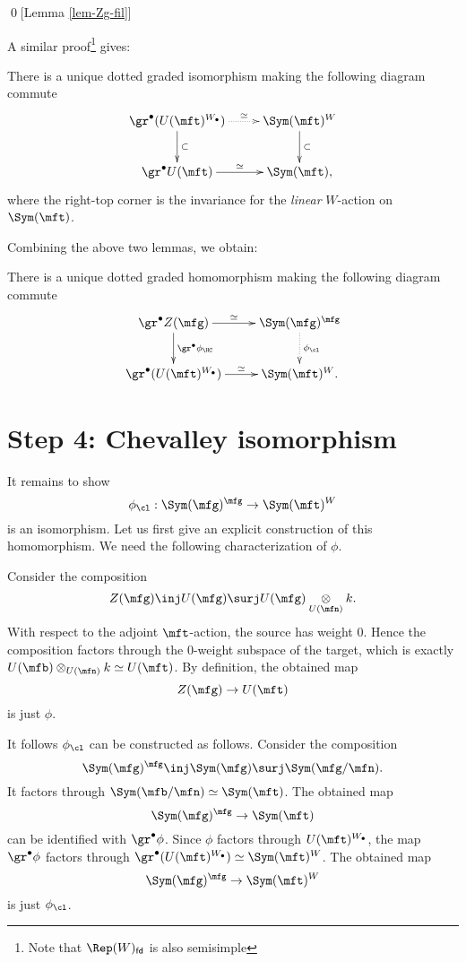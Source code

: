 	\qed[Lemma \ref{lem-Zg-fil}]
	
	A similar proof\footnote{Note that $\Rep(W)_\mathsf{fd}$ is also semisimple} gives:

	\begin{lem}
	\label{lem-UtW-fil}
		There is a unique dotted graded isomorphism making the following diagram commute
		\[
			\xymatrix{
				\gr^\bullet (U(\mft)^{W_\bullet}) \ar@{.>}[r]^-\simeq \ar[d]^-\subset
				& \Sym(\mft)^W \ar[d]^-\subset \\
				\gr^\bullet U(\mft) \ar[r]^-\simeq 
				& \Sym(\mft),
			}
		\]
		where the right-top corner is the invariance for the \emph{linear} $W$-action on $\Sym(\mft)$.
	\end{lem}

	Combining the above two lemmas, we obtain:

	\begin{cor}
		There is a unique dotted graded homomorphism making the following diagram commute
		\[
			\xymatrix{
				\gr^\bullet Z(\mfg) \ar[r]^-\simeq \ar[d]^-{\gr^\bullet \phi_\HC}
				& \Sym(\mfg)^\mfg \ar@{.>}[d]^-{\phi_\cl} \\
				\gr^\bullet (U(\mft)^{W_\bullet})  \ar[r]^-\simeq 
				& \Sym(\mft)^W.
			}
		\]
	\end{cor}

\section{Step 4: Chevalley isomorphism}
	It remains to show
	\[
		\phi_\cl: \Sym(\mfg)^\mfg \to \Sym(\mft)^W
	\]
	is an isomorphism. Let us first give an explicit construction of this homomorphism. We need the following characterization of $\phi$.

	\begin{constr}
		Consider the composition
		\[
			Z(\mfg) \inj U(\mfg) \surj  U(\mfg) \ot_{U(\mfn)} k.
		\]
		With respect to the adjoint $\mft$-action, the source has weight $0$. Hence the composition factors through the $0$-weight subspace of the target, which is exactly $U(\mfb) \ot_{U(\mfn)} k \simeq U(\mft)$. By definition, the obtained map
		\[
			Z(\mfg) \to U(\mft)
		\] 
		is just $\phi$.
	\end{constr}

	\begin{constr}
		It follows $\phi_\cl$ can be constructed as follows. Consider the composition
		\begin{equation}
			\label{eqn-3}
			\Sym(\mfg)^\mfg \inj \Sym(\mfg) \surj \Sym(\mfg/\mfn).
		\end{equation}
		It factors through $\Sym(\mfb/\mfn)\simeq \Sym(\mft)$. The obtained map
		\[
			\Sym(\mfg)^\mfg  \to  \Sym(\mft)
		\]
		can be identified with $\gr^\bullet \phi$. Since $\phi$ factors through $U(\mft)^{W_\bullet}$, the map $\gr^\bullet \phi$ factors through $\gr^\bullet(U(\mft)^{W_\bullet}) \simeq \Sym(\mft)^W$. The obtained map 
		\[
			\Sym(\mfg)^\mfg  \to  \Sym(\mft)^W
		\]
		is just $\phi_\cl$.
	\end{constr}
 
